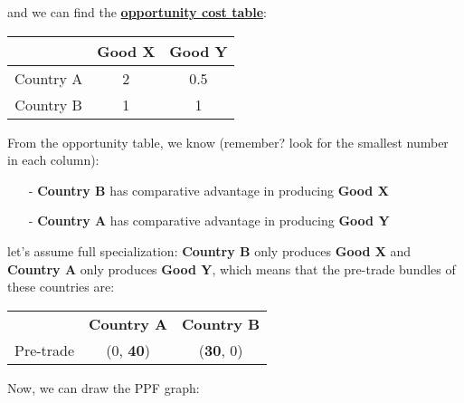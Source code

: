 \documentclass[twoside]{article}
\let\bar\overline
\theoremstyle{definition}
\begin{document}
and we can find the \underline{\textbf{opportunity cost table}}:
\begin{table}[h!]
\centering
    \begin{tabular}{c|cc}
         & Good X & Good Y \\
        \hline
        Country A & 2 & 0.5 \\
        Country B & 1 & 1
    \end{tabular}
\end{table}

From the opportunity table, we know (remember? look for the smallest number in each column):
\begin{itemize}
    \item[-] \textbf{\color{blue!45!black}Country B} has comparative advantage in producing \textbf{\color{blue!45!black}Good X}
    \item[-] \textbf{\color{red!55!black}Country A} has comparative advantage in producing \textbf{\color{red!55!black}Good Y}
\end{itemize}

let's assume full specialization: \textbf{\color{blue!45!black}Country B} only produces \textbf{\color{blue!45!black}Good X} and \textbf{\color{red!55!black}Country A} only produces \textbf{\color{red!55!black}Good Y}, which means that the pre-trade bundles of these countries are:

\begin{table}[h!]
    \centering
    \begin{tabular}{ccc}
       & \textbf{\color{red!55!black}Country A} & \textbf{\color{blue!45!black}Country B} \\
     Pre-trade & (0, \textbf{\color{red!55!black}40}) & (\textbf{\color{blue!45!black}30}, 0)
    \end{tabular}
\end{table}


Now, we can draw the PPF graph:

\begin{center}
\end{center}
\end{document}
